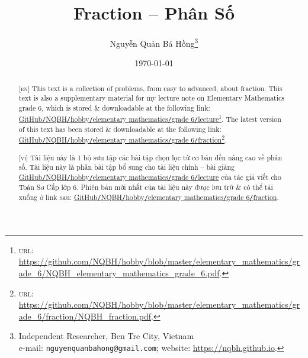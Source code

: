 \documentclass{article}
\title{Fraction -- Phân Số}
\author{Nguyễn Quản Bá Hồng\footnote{Independent Researcher, Ben Tre City, Vietnam\\e-mail: \texttt{nguyenquanbahong@gmail.com}; website: \url{https://nqbh.github.io}.}}
\date{\today}
\numberwithin{equation}{section}
\begin{document}
\maketitle
\begin{abstract}
	\textsc{[en]} This text is a collection of problems, from easy to advanced, about fraction. This text is also a supplementary material for my lecture note on Elementary Mathematics grade 6, which is stored \& downloadable at the following link: \href{https://github.com/NQBH/hobby/blob/master/elementary_mathematics/grade_6/NQBH_elementary_mathematics_grade_6.pdf}{GitHub\texttt{/}NQBH\texttt{/}hobby\texttt{/}elementary mathematics\texttt{/}grade 6\texttt{/}lecture}\footnote{\textsc{url}: \url{https://github.com/NQBH/hobby/blob/master/elementary_mathematics/grade_6/NQBH_elementary_mathematics_grade_6.pdf}.}. The latest version of this text has been stored \& downloadable at the following link: \href{https://github.com/NQBH/hobby/blob/master/elementary_mathematics/grade_6/fraction/NQBH_fraction.pdf}{GitHub\texttt{/}NQBH\texttt{/}hobby\texttt{/}elementary mathematics\texttt{/}grade 6\texttt{/}fraction}\footnote{\textsc{url}: \url{https://github.com/NQBH/hobby/blob/master/elementary_mathematics/grade_6/fraction/NQBH_fraction.pdf}.}.
	\vspace{2mm}
	
	\textsc{[vi]} Tài liệu này là 1 bộ sưu tập các bài tập chọn lọc từ cơ bản đến nâng cao về phân số. Tài liệu này là phần bài tập bổ sung cho tài liệu chính -- bài giảng \href{https://github.com/NQBH/hobby/blob/master/elementary_mathematics/grade_6/NQBH_elementary_mathematics_grade_6.pdf}{GitHub\texttt{/}NQBH\texttt{/}hobby\texttt{/}elementary mathematics\texttt{/}grade 6\texttt{/}lecture} của tác giả viết cho Toán Sơ Cấp lớp 6. Phiên bản mới nhất của tài liệu này được lưu trữ \& có thể tải xuống ở link sau: \href{https://github.com/NQBH/hobby/blob/master/elementary_mathematics/grade_6/fraction/NQBH_fraction.pdf}{GitHub\texttt{/}NQBH\texttt{/}hobby\texttt{/}elementary mathematics\texttt{/}grade 6\texttt{/}fraction}.
\end{abstract}
\tableofcontents
\newpage

\end{document}
